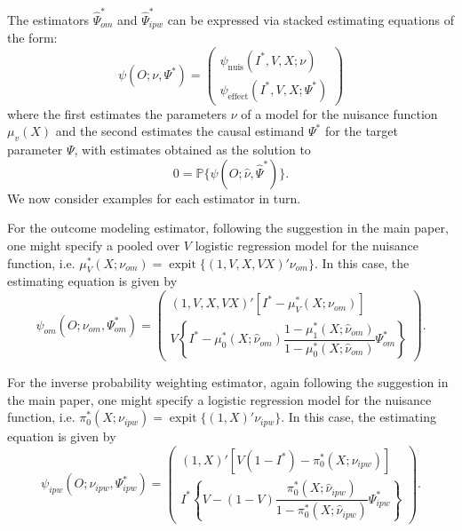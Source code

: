 \begin{appendix}
    The estimators $\widehat{\Psi}^*_{om}$ and $\widehat{\Psi}^*_{ipw}$ can be expressed via stacked estimating equations of the form:
    \begin{equation*}
        \psi(O; \nu, \Psi^*) = \begin{pmatrix}
            \psi_{\text{nuis}}(I^*, V, X; \nu) \\
            \psi_{\text{effect}}(I^*, V, X; \Psi^*)
        \end{pmatrix}
    \end{equation*}
    where the first estimates the parameters $\nu$ of a model for the nuisance function $\mu_v(X)$ and the second estimates the causal estimand $\Psi^*$ for the target parameter $\Psi$, with estimates obtained as the solution to
    \begin{equation*}
        0 = \mathbb{P}\big\{\psi(O; \widehat{\nu}, \widehat{\Psi}^*)\big\}.
    \end{equation*}
    We now consider examples for each estimator in turn. 
    
    For the outcome modeling estimator, following the suggestion in the main paper, one might specify a pooled over $V$ logistic regression model for the nuisance function, i.e. $\mu^*_V(X; \nu_{om}) = \operatorname{expit}\{(1, V, X, VX)'\nu_{om}\}$. In this case, the estimating equation is given by 
    \begin{equation*}
        \psi_{om}(O; \nu_{om}, \Psi^*_{om}) = \begin{pmatrix}
            (1, V, X, VX)'\left[ I^* - \mu^*_V(X; \nu_{om})\right] \\
            V \left\{I^* - \mu^*_0(X; \widehat{\nu}_{om}) \dfrac{1 - \mu^*_1(X; \widehat{\nu}_{om})}{1 - \mu^*_0(X; \widehat{\nu}_{om})}\Psi^*_{om}\right\}
        \end{pmatrix}.
    \end{equation*}

    For the inverse probability weighting estimator, again following the suggestion in the main paper, one might specify a logistic regression model for the nuisance function, i.e. $\pi^*_0(X; \nu_{ipw}) = \operatorname{expit}\{(1, X)'\nu_{ipw}\}$. In this case, the estimating equation is given by 
    \begin{equation*}
        \psi_{ipw}(O; \nu_{ipw}, \Psi^*_{ipw}) = \begin{pmatrix}
            (1, X)'\left[V(1-I^*) - \pi^*_0(X; \nu_{ipw})\right] \\
            I^* \left\{V - (1-V) \dfrac{\pi^*_0(X; \widehat{\nu}_{ipw})}{1 - \pi^*_0(X; \widehat{\nu}_{ipw})}\Psi^*_{ipw}\right\}
        \end{pmatrix}.
    \end{equation*}


\end{appendix}
